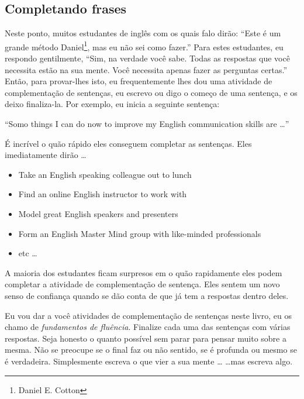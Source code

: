 \subsection{Completando frases}\label{sub:frases}

Neste ponto, muitos estudantes de inglês com os quais falo dirão: ``Este é um
grande método Daniel\footnote{Daniel E. Cotton}, mas eu não sei como fazer.''
Para estes estudantes, eu respondo gentilmente, ``Sim, na verdade você sabe.
Todas as respostas que você necessita estão na sua mente. Você necessita apenas
fazer as perguntas certas.'' Então, para provar-lhes isto, eu frequentemente
lhes dou uma atividade de complementação de sentenças, eu escrevo ou digo
o começo de uma sentença, e os deixo finaliza-la. Por exemplo, eu inicia
a seguinte sentença: \vspace{0.3\baselineskip}

``Somo things I can do now to improve my English communication skills are \dots''
\vspace{0.3\baselineskip}

É incrível o quão rápido eles conseguem completar as sentenças. Eles imediatamente dirão \dots

\begin{itemize}
		\item Take an English speaking colleague out to lunch
		\item Find an online English instructor to work with
        \item Model great English speakers and presenters
        \item Form an English Master Mind group with like-minded professionals
        \item etc \dots
\end{itemize}

A maioria dos estudantes ficam surpresos em o quão rapidamente eles podem
completar a atividade de complementação de sentença. Eles sentem um novo senso
de confiança quando se dão conta de que já tem a respostas dentro deles.

Eu vou dar a você atividades de complementação de sentenças neste livro, eu
os chamo de {\em fundamentos de fluência}. Finalize cada uma das sentenças com
várias respostas. Seja honesto o quanto possível
sem parar para pensar muito sobre a mesma. Não se preocupe se o final faz ou
não sentido, se é profunda ou mesmo se é verdadeira. Simplesmente escreva o que
vier a sua mente \dots \hspace{0.3\baselineskip} \dots  mas escreva algo.

